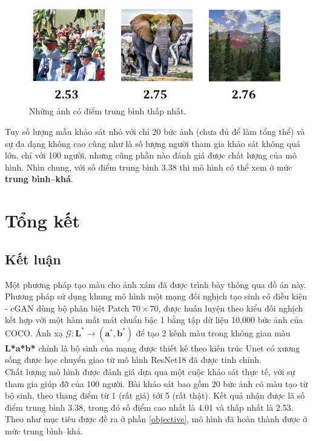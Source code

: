 \documentclass[a4paper, 12pt]{article}
\begin{document}
\begin{figure}[!h]
\captionsetup{width=0.8\textwidth}
\centering
\includegraphics[width=12cm]{images/worst.PNG}
\caption{Những ảnh có điểm trung bình thấp nhất.}
\label{fig:worsttests}
\end{figure}

\noindent
Tuy số lượng mẫu khảo sát nhỏ với chỉ 20 bức ảnh (chưa đủ để làm tổng thể) và sự đa dạng không cao cũng như là số lượng người tham gia khảo sát không quá lớn, chỉ với 100 người, nhưng cũng phần nào đánh giá được chất lượng của mô hình. Nhìn chung, với số điểm trung bình 3.38 thì mô hình có thể xem ở mức \textbf{trung bình--khá}.

\section{Tổng kết}

\subsection{Kết luận}
Một phương pháp tạo màu cho ảnh xám đã được trình bày thông qua đồ án này. Phương pháp sử dụng khung mô hình một mạng đối nghịch tạo sinh có điều kiện - cGAN dùng bộ phân biệt Patch $70\times 70$, được huấn luyện theo kiểu đối nghịch kết hợp với một hàm mất mát chuẩn bậc 1 bằng tập dữ liệu 10,000 bức ảnh của COCO. Ánh xạ $\mathcal{G}:\mathbf{L^*} \rightarrow (\mathbf{a^*}, \mathbf{b^*})$ để tạo 2 kênh màu trong không gian màu \textbf{L*a*b*} chính là bộ sinh của mạng được thiết kế theo kiến trúc Unet có xương sống được học chuyển giao từ mô hình ResNet18 đã được tinh chỉnh.\vspace{5pt}\\
Chất lượng mô hình được đánh giá dựa qua một cuộc khảo sát thực tế, với sự tham gia giúp đỡ của 100 người. Bài khảo sát bao gồm 20 bức ảnh có màu tạo từ bộ sinh, theo thang điểm từ 1 (rất giả) tới 5 (rất thật). Kết quả nhận được là số điểm trung bình 3.38, trong đó số điểm cao nhất là 4.01 và thấp nhất là 2.53. Theo như mục tiêu được đề ra ở phần \ref{objective}, mô hình đã hoàn thành được ở mức trung bình--khá.
\end{document}
